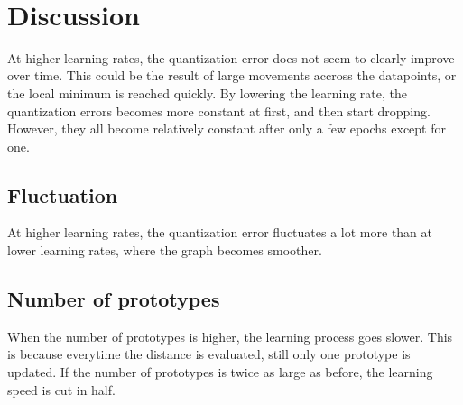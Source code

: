 \documentclass[10pt,a4paper]{article}
\begin{document}
 \\

\section{Discussion}
At higher learning rates, the quantization error does not seem to clearly improve over time. This could be the result of large movements accross the datapoints, or the local minimum is reached quickly. By lowering the learning rate, the quantization errors becomes more constant at first, and then start dropping. However, they all become relatively constant after only a few epochs except for one. 

\subsection{Fluctuation}
At higher learning rates, the quantization error fluctuates a lot more than at lower learning rates, where the graph becomes smoother.

\subsection{Number of prototypes}
When the number of prototypes is higher, the learning process goes slower. This is because everytime the distance is evaluated, still only one prototype is updated. If the number of prototypes is twice as large as before, the learning speed is cut in half.
\end{document}
